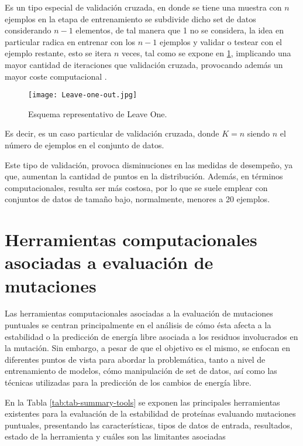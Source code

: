 Es un tipo especial de validación cruzada, en donde se tiene una muestra con $n$ ejemplos en la etapa de entrenamiento se subdivide dicho set de datos considerando $n-1$ elementos, de tal manera que 1 no se considera, la idea en particular radica en entrenar con los $n-1$ ejemplos y validar o testear con el ejemplo restante, esto se itera $n$ veces, tal como se expone en \ref{LOO}, implicando una mayor cantidad de iteraciones que validación cruzada, provocando además un mayor coste computacional \cite{kohavi1995study}.

\begin{figure}[!h]
	\centering
	\texttt{[image: Leave-one-out.jpg]}
	\caption{Esquema representativo de Leave One.}
	\label{LOO}
\end{figure}

Es decir, es un caso particular de validación cruzada, donde $K=n$ siendo $n$ el número de ejemplos en el conjunto de datos.

Este tipo de validación, provoca disminuciones en las medidas de desempeño, ya que, aumentan la cantidad de puntos en la distribución. Además, en términos computacionales, resulta ser más costosa, por lo que se suele emplear con conjuntos de datos de tamaño bajo, normalmente, menores a 20 ejemplos.

\section{Herramientas computacionales asociadas a evaluación de mutaciones}

Las herramientas computacionales asociadas a la evaluación de mutaciones puntuales se centran principalmente en el análisis de cómo ésta afecta a la estabilidad o la predicción de energía libre asociada a los residuos involucrados en la mutación. Sin embargo, a pesar de que el objetivo es el mismo, se enfocan en diferentes puntos de vista para abordar la problemática, tanto a nivel de entrenamiento de modelos, cómo manipulación de set de datos, así como las técnicas utilizadas para la predicción de los cambios de energía libre.

En la Tabla \ref{tab:tab-summary-tools} se exponen las principales herramientas existentes para la evaluación de la estabilidad de proteínas evaluando mutaciones puntuales, presentando las características, tipos de datos de entrada, resultados, estado de la herramienta y cuáles son las limitantes asociadas

